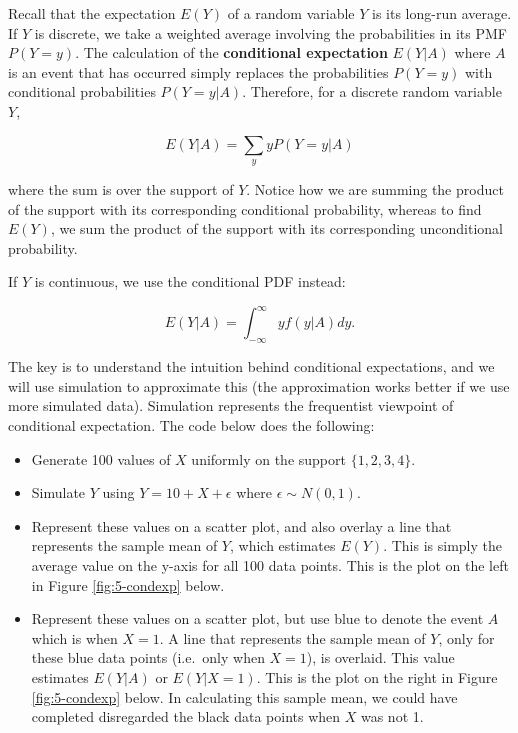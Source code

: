 \documentclass[
]{book}
\providecommand{\tightlist}{%
  \setlength{\itemsep}{0pt}\setlength{\parskip}{0pt}}
\begin{document}
Recall that the expectation \(E(Y)\) of a random variable \(Y\) is its long-run average. If \(Y\) is discrete, we take a weighted average involving the probabilities in its PMF \(P(Y=y)\). The calculation of the \textbf{conditional expectation} \(E(Y|A)\) where \(A\) is an event that has occurred simply replaces the probabilities \(P(Y=y)\) with conditional probabilities \(P(Y=y|A)\). Therefore, for a discrete random variable \(Y\),

\begin{equation} 
E(Y|A) = \sum_y y P(Y=y|A) 
\label{eq:5-condexpdis}
\end{equation}

where the sum is over the support of \(Y\). Notice how we are summing the product of the support with its corresponding conditional probability, whereas to find \(E(Y)\), we sum the product of the support with its corresponding unconditional probability.

If \(Y\) is continuous, we use the conditional PDF instead:

\begin{equation} 
E(Y|A) = \int_{-\infty}^{\infty} y f(y|A) dy.
\label{eq:5-condexpcont}
\end{equation}

The key is to understand the intuition behind conditional expectations, and we will use simulation to approximate this (the approximation works better if we use more simulated data). Simulation represents the frequentist viewpoint of conditional expectation. The code below does the following:

\begin{itemize}
\tightlist
\item
  Generate 100 values of \(X\) uniformly on the support \(\{1,2,3,4\}\).
\item
  Simulate \(Y\) using \(Y = 10 + X + \epsilon\) where \(\epsilon \sim N(0,1)\).
\item
  Represent these values on a scatter plot, and also overlay a line that represents the sample mean of \(Y\), which estimates \(E(Y)\). This is simply the average value on the y-axis for all 100 data points. This is the plot on the left in Figure \ref{fig:5-condexp} below.
\item
  Represent these values on a scatter plot, but use blue to denote the event \(A\) which is when \(X=1\). A line that represents the sample mean of \(Y\), only for these blue data points (i.e.~only when \(X=1\)), is overlaid. This value estimates \(E(Y|A)\) or \(E(Y|X=1)\). This is the plot on the right in Figure \ref{fig:5-condexp} below. In calculating this sample mean, we could have completed disregarded the black data points when \(X\) was not 1.
\end{itemize}
\end{document}
